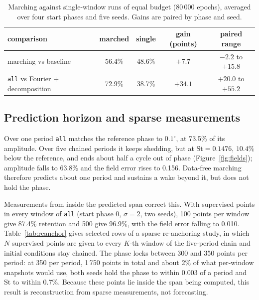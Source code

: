 \documentclass[11pt,a4paper]{article}
\newcommand{\St}{\mathrm{St}}
\begin{document}
\begin{table}[h]
\centering
\caption{Marching against single-window runs of equal budget ($80\,000$
epochs), averaged over four start phases and five seeds. Gains are paired by
phase and seed.}
\label{tab:budget}
\small
\begin{tabular}{lcccc}
\toprule
comparison & marched & single & gain (points) & paired range \\
\midrule
marching vs baseline                  & 56.4\% & 48.6\% & $+7.7$  & $-2.2$ to $+15.8$ \\
\texttt{all} vs Fourier + decomposition & 72.9\% & 38.7\% & $+34.1$ & $+20.0$ to $+55.2$ \\
\bottomrule
\end{tabular}
\end{table}

\subsection{Prediction horizon and sparse measurements}

Over one period \texttt{all} matches the reference phase to $0.1^\circ$, at
73.5\% of its amplitude. Over five chained periods it keeps shedding, but at
$\St = 0.1476$, $10.4\%$ below the reference, and ends about half a cycle out
of phase (Figure~\ref{fig:fields}); amplitude falls to 63.8\% and the field
error rises to 0.156. Data-free marching therefore predicts about one period
and sustains a wake beyond it, but does not hold the phase.

Measurements from inside the predicted span correct this. With supervised
points in every window of \texttt{all} (start phase 0, $\sigma = 2$, two
seeds), 100 points per window give 87.4\% retention and 500 give 96.9\%, with
the field error falling to 0.010. Table~\ref{tab:reanchor} gives selected rows
of a sparse re-anchoring study, in which $N$ supervised points are given to
every $K$-th window of the five-period chain and initial conditions stay
chained. The phase locks between 300 and 350 points per period: at 350 per
period, 1\,750 points in total and about 2\% of what per-window snapshots
would use, both seeds hold the phase to within 0.003 of a period and $\St$ to
within 0.7\%. Because these points lie inside the span being computed, this
result is reconstruction from sparse measurements, not forecasting.
\end{document}

